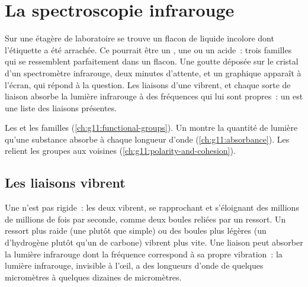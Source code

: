 \chapter{La spectroscopie infrarouge}\label{ch:g11:infrared}

Sur une étagère de laboratoire se trouve un flacon de liquide incolore
dont l'étiquette a été arrachée. Ce pourrait être un , une 
ou un acide~: trois familles qui se ressemblent parfaitement dans un
flacon. Une goutte déposée sur le cristal d'un spectromètre infrarouge,
deux minutes d'attente, et un graphique apparaît à l'écran, qui répond à
la question. Les liaisons d'une  vibrent, et chaque sorte de
liaison absorbe la lumière infrarouge à des fréquences qui lui sont
propres~: un  est une liste des liaisons présentes.

\begin{recall}
Les  et les familles
(\cref{ch:g11:functional-groups}). Un  montre la
quantité de lumière qu'une substance absorbe à chaque longueur d'onde
(\cref{ch:g11:absorbance}). Les  relient les groupes
 aux  voisines (\cref{ch:g11:polarity-and-cohesion}).
\end{recall}

\section{Les liaisons vibrent}

Une  n'est pas rigide~: les deux  vibrent, se
rapprochant et s'éloignant des millions de millions de fois par seconde,
comme deux boules reliées par un ressort. Un ressort plus raide (une
 plutôt que simple) ou des boules plus légères (un 
d'hydrogène plutôt qu'un  de carbone) vibrent plus vite. Une
liaison peut absorber la lumière infrarouge dont la fréquence correspond
à sa propre vibration~: la lumière infrarouge, invisible à l'œil, a des
longueurs d'onde de quelques micromètres à quelques dizaines de
micromètres.

